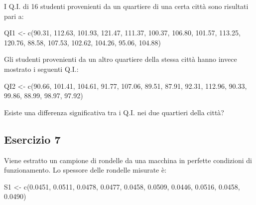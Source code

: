 \documentclass[a4paper,12pt,oneside]{book}
\newenvironment{Shaded}{\begin{snugshade}}{\end{snugshade}}
\newcommand{\FloatTok}[1]{#1}
\newcommand{\OtherTok}[1]{#1}
\newcommand{\FunctionTok}[1]{#1}
\newcommand{\NormalTok}[1]{#1}
\begin{document}
I Q.I. di 16 studenti provenienti da un quartiere di una certa città sono risultati pari a:

\begin{Shaded}
\begin{Highlighting}[]
\NormalTok{QI1 }\OtherTok{\textless{}{-}} \FunctionTok{c}\NormalTok{(}\FloatTok{90.31}\NormalTok{, }\FloatTok{112.63}\NormalTok{, }\FloatTok{101.93}\NormalTok{, }\FloatTok{121.47}\NormalTok{, }\FloatTok{111.37}\NormalTok{, }\FloatTok{100.37}\NormalTok{, }\FloatTok{106.80}\NormalTok{,}
         \FloatTok{101.57}\NormalTok{, }\FloatTok{113.25}\NormalTok{, }\FloatTok{120.76}\NormalTok{,  }\FloatTok{88.58}\NormalTok{, }\FloatTok{107.53}\NormalTok{, }\FloatTok{102.62}\NormalTok{, }\FloatTok{104.26}\NormalTok{,}
         \FloatTok{95.06}\NormalTok{, }\FloatTok{104.88}\NormalTok{)}
\end{Highlighting}
\end{Shaded}

Gli studenti provenienti da un altro quartiere della stessa città hanno invece mostrato i seguenti Q.I.:

\begin{Shaded}
\begin{Highlighting}[]
\NormalTok{QI2 }\OtherTok{\textless{}{-}} \FunctionTok{c}\NormalTok{(}\FloatTok{90.66}\NormalTok{, }\FloatTok{101.41}\NormalTok{, }\FloatTok{104.61}\NormalTok{,  }\FloatTok{91.77}\NormalTok{, }\FloatTok{107.06}\NormalTok{,  }\FloatTok{89.51}\NormalTok{,  }\FloatTok{87.91}\NormalTok{,}
         \FloatTok{92.31}\NormalTok{, }\FloatTok{112.96}\NormalTok{,  }\FloatTok{90.33}\NormalTok{,  }\FloatTok{99.86}\NormalTok{,  }\FloatTok{88.99}\NormalTok{,  }\FloatTok{98.97}\NormalTok{,  }\FloatTok{97.92}\NormalTok{)}
\end{Highlighting}
\end{Shaded}

Esiste una differenza significativa tra i Q.I. nei due quartieri della città?

\hypertarget{esercizio-7-1}{%
\subsection{Esercizio 7}\label{esercizio-7-1}}

Viene estratto un campione di rondelle da una macchina in perfette condizioni di funzionamento. Lo spessore delle rondelle misurate è:

\begin{Shaded}
\begin{Highlighting}[]
\NormalTok{S1 }\OtherTok{\textless{}{-}} \FunctionTok{c}\NormalTok{(}\FloatTok{0.0451}\NormalTok{, }\FloatTok{0.0511}\NormalTok{, }\FloatTok{0.0478}\NormalTok{, }\FloatTok{0.0477}\NormalTok{, }\FloatTok{0.0458}\NormalTok{, }\FloatTok{0.0509}\NormalTok{, }\FloatTok{0.0446}\NormalTok{,}
        \FloatTok{0.0516}\NormalTok{, }\FloatTok{0.0458}\NormalTok{, }\FloatTok{0.0490}\NormalTok{)}
\end{Highlighting}
\end{Shaded}
\end{document}

